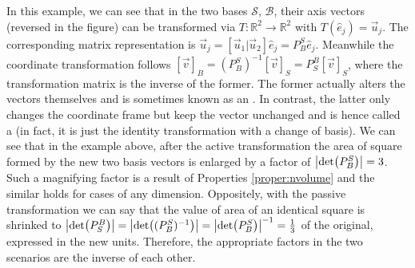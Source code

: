 \begin{solution}
\begin{center}
\end{center}
\end{solution}
In this example, we can see that in the two bases $\mathcal{S}$, $\mathcal{B}$, their axis vectors (reversed in the figure) can be transformed via $T: \mathbb{R}^2 \to \mathbb{R}^2$ with $T(\hat{e}_j) = \vec{u}_j$. The corresponding matrix representation is $\vec{u}_j = [\vec{u}_1|\vec{u}_2]\hat{e}_j = P_B^S\hat{e}_j$. Meanwhile the coordinate transformation follows $[\vec{v}]_B = (P_B^S)^{-1}[\vec{v}]_S = P_S^B[\vec{v}]_S$, where the transformation matrix is the inverse of the former. The former actually alters the vectors themselves and is sometimes known as an . In contrast, the latter only changes the coordinate frame but keep the vector unchanged and is hence called a  (in fact, it is just the identity transformation with a change of basis). We can see that in the example above, after the active transformation the area of square formed by the new two basis vectors is enlarged by a factor of $\abs{\det(P_B^S)}=3$. Such a magnifying factor is a result of Properties \ref{proper:nvolume} and the similar holds for cases of any dimension. Oppositely, with the passive transformation we can say that the value of area of an identical square is shrinked to $\abs{\det(P_S^B)} = \abs{\det((P_B^S)^{-1})} = \abs{\det(P_B^S)}^{-1} = \frac{1}{3}$ of the original, expressed in the new units. Therefore, the appropriate factors in the two scenarios are the inverse of each other.


